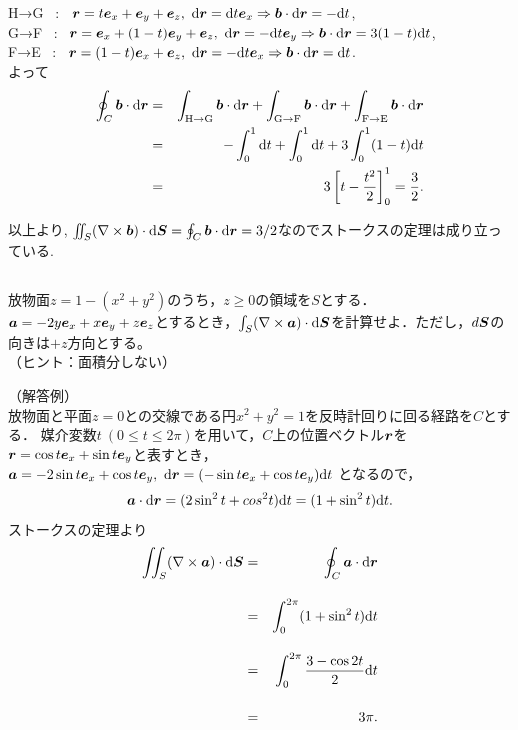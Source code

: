 \documentclass[a4paper,11pt,fleqn]{jarticle}
\def \vec#1{\mbox{\boldmath $#1$}} %
\def \rot{\nabla \times} %
\def \intt{\int\!\!\!\int} %
\begin{document}
H→G \ : \ $\vec{r}=t \vec{e}_{x}+\vec{e}_{y}+\vec{e}_{z}, \ \mathrm{d}\vec{r}=\mathrm{d}t \vec{e}_{x} \Rightarrow \vec{b}\cdot \mathrm{d}\vec{r}=-\mathrm{d}t$,\\
G→F \ : \ $\vec{r}= \vec{e}_{x}+(1-t)\vec{e}_{y}+\vec{e}_{z}, \ \mathrm{d}\vec{r}=-\mathrm{d}t \vec{e}_{y} \Rightarrow \vec{b}\cdot \mathrm{d}\vec{r}=3(1-t)\mathrm{d}t$,\\
F→E \ : \ $\vec{r}=(1-t) \vec{e}_{x}+\vec{e}_{z}, \ \mathrm{d}\vec{r}=-\mathrm{d}t \vec{e}_{x} \Rightarrow \vec{b}\cdot \mathrm{d}\vec{r}=\mathrm{d}t$.\\[8pt]
よって
\begin{eqnarray*}
\oint_C\vec b \cdot \mathrm{d}\vec{r} &=& \int_{\rm H\to\rm G}\vec b \cdot \mathrm{d}\vec{r} 
 + \int_{\rm G\to\rm F}\vec b \cdot \mathrm{d}\vec{r}+\int_{\rm F\to\rm E}\vec b \cdot \mathrm{d}\vec{r}\\
 &=& -\int_0^1 \mathrm{d}t + \int_0^1 \mathrm{d}t + 3\int_0^1 (1-t)\mathrm{d}t\\
 &=& 3 \left[t-\frac{t^2}{2} \right]^1_0=\frac{3}{2}.
\end{eqnarray*}

以上より,
$\intt_S(\rot \vec b)\cdot \mathrm{d}\vec{S}=\oint_C\vec b \cdot \mathrm{d}\vec{r}=3/2$なのでストークスの定理は成り立っている.\\

\subsection{}
放物面$z=1-(x^2+y^2)$のうち，$z\ge 0$の領域を$S$とする．
$\vec{a}=-2y \vec{e}_{x}+ x \vec{e}_{y}+ z \vec{e}_{z}$とするとき，$\int_S(\nabla\times \vec{a})\cdot \mathrm{d}\vec{S}$を計算せよ．ただし，$d\vec{S}$の向きは$+z$方向とする。\\
（ヒント：面積分しない）

（解答例）\\[10pt]
放物面と平面$z=0$との交線である円$x^2+y^2=1$を反時計回りに回る経路を$C$とする．
媒介変数$t \ (0\le t\le 2\pi)$を用いて，$C$上の位置ベクトル$\vec{r}$を$\vec{r}=\cos t \vec{e}_{x}+\sin t \vec{e}_{y}$と表すとき，
$\vec{a}=-2\sin t \vec{e}_{x}+\cos t \vec{e}_{y}, \ \mathrm{d}\vec{r}=(-\sin t \vec{e}_{x}+\cos t \vec{e}_{y})\mathrm{d}t$
となるので，
%
\begin{eqnarray*}
\label{a}
\vec{a}\cdot \mathrm{d}\vec{r}=(2\sin^2 t + cos^2 t)\mathrm{d}t = (1+\sin^2 t)\mathrm{d}t.
\end{eqnarray*}
%
ストークスの定理より
\begin{eqnarray*}
\intt_{S} (\nabla \times \vec{a})\cdot \mathrm{d}\vec{S}&=&\oint_C \vec{a}\cdot \mathrm{d}\vec{r}\\[10pt]
&=& \int_{0}^{2\pi}(1+\sin^2 t)\mathrm{d}t \\[10pt]
&=& \int_{0}^{2\pi}\frac{3-\cos 2t}{2}\mathrm{d}t\\[12pt]
&=& 3\pi.
\end{eqnarray*}
\end{document}

